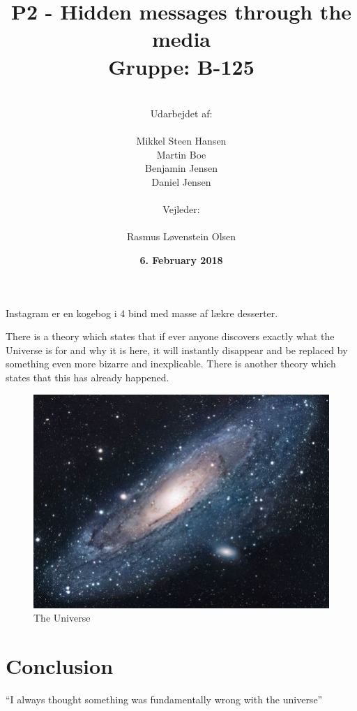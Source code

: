 \documentclass[11pt]{article}
\title{P2 - Hidden messages through the media \\ Gruppe: B-125}
\author{
    \\
    Udarbejdet af:\\
    \\
    Mikkel Steen Hansen\\
    Martin Boe\\
    Benjamin Jensen\\
    Daniel Jensen\\
    \\
    Vejleder:\\ 
    \\
    Rasmus Løvenstein Olsen\\
}
\date{\textbf{ 6. February 2018}}
\renewcommand{\baselinestretch}{1.20}
\begin{document}
\begin{titlepage}
\clearpage
\maketitle
\thispagestyle{empty}

\newpage
\end{titlepage}

\renewcommand{\baselinestretch}{0.8} 
\tableofcontents
\renewcommand{\baselinestretch}{1.20} 
\newpage




Instagram er en kogebog i 4 bind med masse af lækre desserter.

There is a theory which states that if ever anyone discovers exactly what the Universe is for and why it is here, it will instantly disappear and be replaced by something even more bizarre and inexplicable.
There is another theory which states that this has already happened. \citep{adams1995hitchhiker2}

\begin{figure}[h!]
\centering
\includegraphics[scale=1.7]{universe.jpg}
\caption{The Universe}
\label{fig:univerise}
\end{figure}

\section{Conclusion}
``I always thought something was fundamentally wrong with the universe'' \citep{adams1995hitchhiker}



\end{document}
